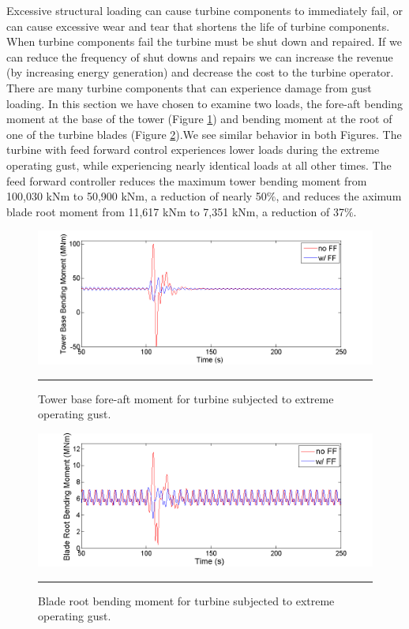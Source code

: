 Excessive structural loading can cause turbine components to immediately fail, or can cause excessive wear and tear that shortens the life of turbine components. When turbine components fail the turbine must be shut down and repaired. If we can reduce the frequency of shut downs and repairs we can increase the revenue (by increasing energy generation) and decrease the cost to the turbine operator. There are many turbine components that can experience damage from gust loading. In this section we have chosen to examine two loads, the fore-aft bending moment at the base of the tower (Figure \ref{fig3-16}) and bending moment at the root of one of the turbine blades (Figure \ref{fig3-17}).We see similar behavior in both Figures. The turbine with feed forward control experiences lower loads during the extreme operating gust, while experiencing nearly identical loads at all other times. The feed forward controller reduces the maximum tower bending moment from 100,030 kNm to 50,900 kNm, a reduction of nearly 50$\%$, and reduces the aximum blade root moment from 11,617 kNm to 7,351 kNm, a reduction of 37$\%$.

\begin{figure}[htbp]
	\centering
		\includegraphics[trim = {1cm 0 2cm 0}, clip, width = \linewidth]{Figures/ch3Figures/fig3-16.png}
		\rule{35em}{0.5pt}
	\caption{Tower base fore-aft moment for turbine subjected to extreme operating gust.}
	\label{fig3-16}
\end{figure}

\begin{figure}[htbp]
	\centering
		\includegraphics[trim = {1cm 0 2cm 0}, clip, width = \linewidth]{Figures/ch3Figures/fig3-17.png}
		\rule{35em}{0.5pt}
	\caption{Blade root bending moment for turbine subjected to extreme operating gust.}
	\label{fig3-17}
\end{figure}

